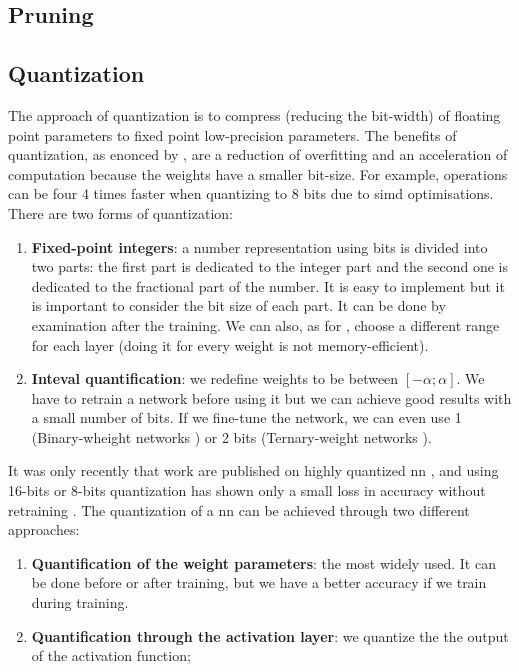 \subsection{Pruning} \label{subs:pruning}

\subsection{Quantization} \label{subs:quantization}
The approach of quantization is to compress (reducing the bit-width) of floating point parameters to fixed point low-precision parameters. The benefits of quantization, as enonced by \cite{joos_de_ter_beerst_accelerating_2019}, are a reduction of overfitting and an acceleration of computation because the weights have a smaller bit-size. For example, operations can be four 4 times faster when quantizing to 8 bits due to \acrshort{simd} optimisations. \newline \newline
%
There are two forms of quantization:
\begin{enumerate}
    \item \textbf{Fixed-point integers}: a number representation using bits is divided into two parts: the first part is dedicated to the integer part and the second one is dedicated to the fractional part of the number. It is easy to implement but it is important to consider the bit size of each part. It can be done by examination after the training. We can also, as for \cite{21,22}, choose a different range for each layer (doing it for every weight is not memory-efficient).
    \item \textbf{Inteval quantification}: we redefine weights to be between $[-\alpha; \alpha]$. We have to retrain a network before using it but we can achieve good results with a small number of bits. If we fine-tune the network, we can even use 1 (Binary-wheight networks \cite{courbariaux_binarized_2016}) or 2 bits (Ternary-weight networks \cite{li_ternary_2016}).
\end{enumerate}
%
It was only recently that work are published on highly quantized \acrshort{nn} \cite{guo_survey_2018}, and using 16-bits or 8-bits quantization has shown only a small loss in accuracy without retraining \cite{abdelouahab_accelerating_2018}. The quantization of a \acrshort{nn} can be achieved through two different approaches:
\begin{enumerate}
    \item \textbf{Quantification of the weight parameters}: the most widely used. It can be done before or after training, but we have a better accuracy if we train during training.
    \item \textbf{Quantification through the activation layer}: we quantize the the output of the activation function;
\end{enumerate}
